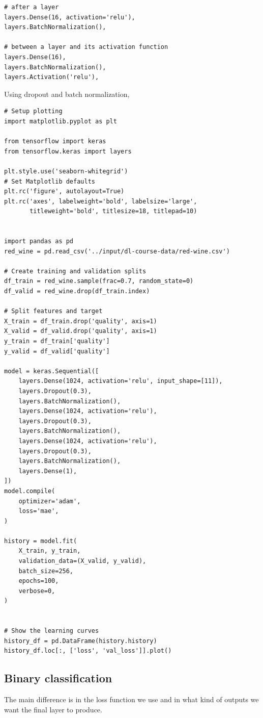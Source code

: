 \begin{lstlisting}
# after a layer
layers.Dense(16, activation='relu'),
layers.BatchNormalization(),

# between a layer and its activation function
layers.Dense(16),
layers.BatchNormalization(),
layers.Activation('relu'),
\end{lstlisting}

\vspace{0.5cm}

\noindent Using dropout and batch normalization,

\begin{lstlisting}
# Setup plotting
import matplotlib.pyplot as plt

from tensorflow import keras
from tensorflow.keras import layers

plt.style.use('seaborn-whitegrid')
# Set Matplotlib defaults
plt.rc('figure', autolayout=True)
plt.rc('axes', labelweight='bold', labelsize='large',
       titleweight='bold', titlesize=18, titlepad=10)


import pandas as pd
red_wine = pd.read_csv('../input/dl-course-data/red-wine.csv')

# Create training and validation splits
df_train = red_wine.sample(frac=0.7, random_state=0)
df_valid = red_wine.drop(df_train.index)

# Split features and target
X_train = df_train.drop('quality', axis=1)
X_valid = df_valid.drop('quality', axis=1)
y_train = df_train['quality']
y_valid = df_valid['quality']

model = keras.Sequential([
    layers.Dense(1024, activation='relu', input_shape=[11]),
    layers.Dropout(0.3),
    layers.BatchNormalization(),
    layers.Dense(1024, activation='relu'),
    layers.Dropout(0.3),
    layers.BatchNormalization(),
    layers.Dense(1024, activation='relu'),
    layers.Dropout(0.3),
    layers.BatchNormalization(),
    layers.Dense(1),
])
model.compile(
    optimizer='adam',
    loss='mae',
)

history = model.fit(
    X_train, y_train,
    validation_data=(X_valid, y_valid),
    batch_size=256,
    epochs=100,
    verbose=0,
)


# Show the learning curves
history_df = pd.DataFrame(history.history)
history_df.loc[:, ['loss', 'val_loss']].plot()
\end{lstlisting}

\subsection{Binary classification}
\noindent The main difference is in the loss function we use and in what kind of outputs we
want the final layer to produce.

